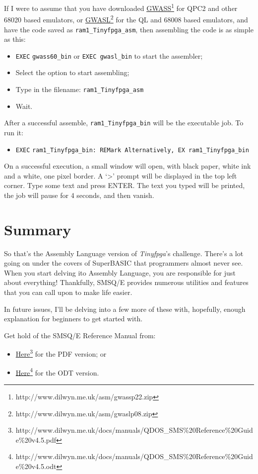 If I were to assume that you have downloaded \href{http://www.dilwyn.me.uk/asm/gwassp22.zip}{GWASS}\footnote{http://www.dilwyn.me.uk/asm/gwassp22.zip}
for QPC2 and other 68020 based emulators, or \href{http://www.dilwyn.me.uk/asm/gwaslp08.zip}{GWASL}\footnote{http://www.dilwyn.me.uk/asm/gwaslp08.zip}
for the QL and 68008 based emulators, and have the code saved as \texttt{ram1\_Tinyfpga\_asm},
then assembling the code is as simple as this:
\begin{itemize}
\item \texttt{EXEC} \texttt{gwass60\_bin} or \texttt{EXEC gwasl\_bin} to
start the assembler;
\item Select the option to start assembling;
\item Type in the filename: \texttt{ram1\_Tinyfpga\_asm}
\item Wait.
\end{itemize}
After a successful assemble, \texttt{ram1\_Tinyfpga\_bin} will be
the executable job. To run it:
\begin{itemize}
\item \texttt{EXEC} \texttt{ram1\_Tinyfpga\_bin: REMark Alternatively, EX
ram1\_Tinyfpga\_bin}
\end{itemize}
On a successful execution, a small window will open, with black paper,
white ink and a white, one pixel border. A `>' prompt will be displayed
in the top left corner. Type some text and press ENTER. The text you
typed will be printed, the job will pause for 4 seconds, and then
vanish.

\section{Summary}

So that's the Assembly Language version of \emph{Tinyfpga}'s challenge.
There's a lot going on under the covers of SuperBASIC that programmers
almost never see. When you start delving ito Assembly Language, you
are responsible for just about everything! Thankfully, SMSQ/E provides
numerous utilities and features that you can call upon to make life
easier. 

In future issues, I'll be delving into a few more of these with, hopefully,
enough explanation for beginners to get started with.

Get hold of the SMSQ/E Reference Manual from:
\begin{itemize}
\item \href{http://www.dilwyn.me.uk/docs/manuals/QDOS_SMS\%20Reference\%20Guide\%20v4.5.pdf}{Here}\footnote{http://www.dilwyn.me.uk/docs/manuals/QDOS\_SMS\%20Reference\%20Guide\%20v4.5.pdf}
for the PDF version; or
\item \href{http://www.dilwyn.me.uk/docs/manuals/QDOS_SMS\%20Reference\%20Guide\%20v4.5.odt}{Here}\footnote{http://www.dilwyn.me.uk/docs/manuals/QDOS\_SMS\%20Reference\%20Guide\%20v4.5.odt}
for the ODT version.
\end{itemize}

